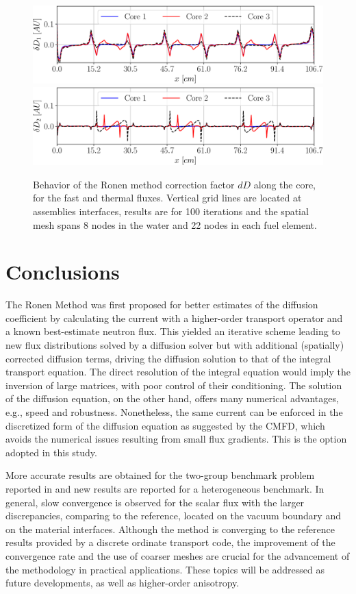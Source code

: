 \begin{figure}[htbp!]
	\centering
	\includegraphics[width=0.6\linewidth]{RM_dD1_100it_8_22_728.pdf}
	\includegraphics[width=0.6\linewidth]{RM_dD2_100it_8_22_728.pdf}
	\caption{Behavior of the Ronen method correction factor $dD$ along the core, for the fast and thermal fluxes. Vertical grid lines are located at assemblies interfaces, results are for 100 iterations and the spatial mesh spans 8 nodes in the water and 22 nodes in each fuel element.}
	\label{fig:Dcoef}
\end{figure}






%
\section{Conclusions}
\label{sec:conc}

The Ronen Method was first proposed for better estimates of the diffusion coefficient by calculating the current with a higher-order transport operator and a known best-estimate neutron flux. This yielded an iterative scheme leading to new flux distributions solved by a diffusion solver but with additional (spatially) corrected diffusion terms, driving the diffusion solution to that of the integral transport equation. The direct resolution of the integral equation would imply the inversion of large matrices, with poor control of their conditioning. The solution of the diffusion equation, on the other hand, offers many numerical advantages, e.g., speed and robustness. Nonetheless, the same current can be enforced in the discretized form of the diffusion equation as suggested by the CMFD, which avoids the numerical issues resulting from small flux gradients. This is the option adopted in this study.  

More accurate results are obtained for the two-group benchmark problem reported in \cite{Tomatis-2011} and new results are reported for a heterogeneous benchmark. In general, slow convergence is observed for the scalar flux with the larger discrepancies, comparing to the reference, located on the vacuum boundary and on the material interfaces. Although the method is converging to the reference results provided by a discrete ordinate transport code, the improvement of the convergence rate and the use of coarser meshes are crucial for the advancement of the methodology in practical applications. These topics will be addressed as future developments, as well as higher-order anisotropy.

